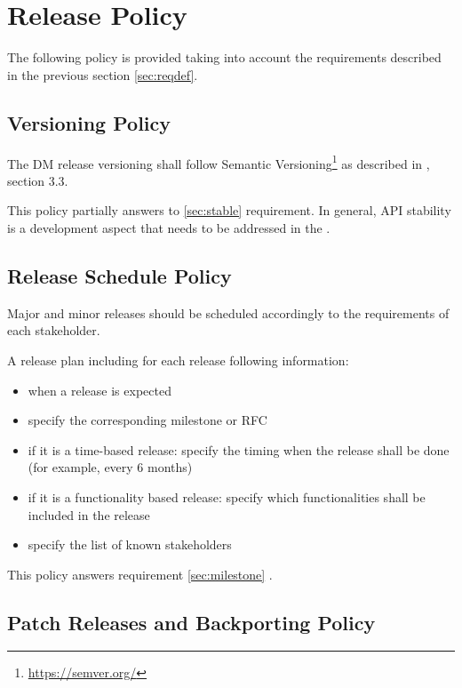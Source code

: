 \section{Release Policy} \label{sec:policy}

The following policy is provided taking into account the requirements described in the previous section \ref{sec:reqdef}.


\subsection{Versioning Policy} \label{sec:versinopolicy}

The DM release versioning shall follow Semantic Versioning\footnote{\url{https://semver.org/}} as described in , section 3.3.

This policy partially answers to \ref{sec:stable} requirement.
In general, API stability is a development aspect that needs to be addressed in the .


\subsection{Release Schedule Policy} \label{sec:schedulepolicy}

Major and minor releases should be scheduled accordingly to the requirements of each stakeholder.

A release plan including for each release following information:

\begin{itemize}
\item when a release is expected
\item specify the corresponding milestone or RFC
\item if it is a time-based release: specify the timing when the release shall be done (for example, every 6 months)
\item if it is a functionality based release: specify which functionalities shall be included in the release
\item specify the list of known stakeholders
\end{itemize}

This policy answers requirement \ref{sec:milestone} .


\subsection{Patch Releases and Backporting Policy} \label{sec:patchpolicy}


